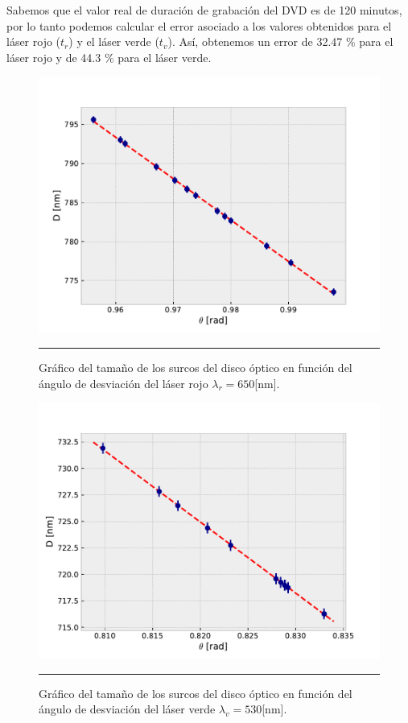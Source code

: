 \documentclass[10pt,a4paper]{article}
\begin{document}
\begin{multicols}{2}
	Sabemos que el valor real de duración de grabación del DVD es de 120 minutos, por lo tanto podemos calcular el error asociado a los valores obtenidos para el láser rojo ($t_r$) y el láser verde ($t_v$). Así, obtenemos un error de 32.47 $\%$ para el láser rojo y de 44.3 $\%$ para el láser verde.
	
	\begin{figure}[H]
		\centering
		\includegraphics[scale=0.4]{laser_rojo.pdf}
		\caption{Gráfico del tamaño de los surcos del disco óptico en función del ángulo de desviación del láser rojo $\lambda_r = 650$[nm].}
		\label{Grafico laser rojo}
		\rule{80mm}{0.1mm}
	\end{figure}
	
	\begin{figure}[H]
		\centering
		\includegraphics[scale=0.4]{laser_verde.pdf}
		\caption{Gráfico del tamaño de los surcos del disco óptico en función del ángulo de desviación del láser verde $\lambda_v = 530$[nm]. }
		\label{Grafico laser verde}
		\rule{80mm}{0.1mm}
	\end{figure}
	


\end{multicols}
\end{document}
